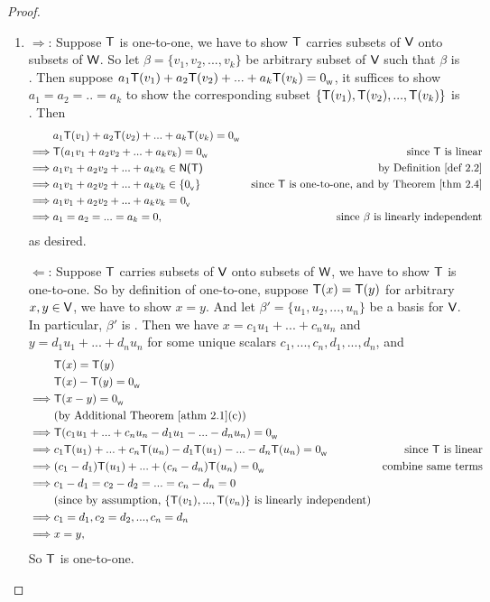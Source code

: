\begin{proof} \ 
\begin{enumerate}
\item
\(\Longrightarrow\): Suppose \(\textsf{T}\) is one-to-one, we have to show \(\textsf{T}\) carries \LID{} subsets of \(\textsf{V}\) onto \LID{} subsets of \(\textsf{W}\).
So let \(\beta = \{ v_1, v_2, ..., v_k \}\) be arbitrary subset of \(\textsf{V}\) such that \(\beta\) is \LID{}.
Then suppose \(a_1\textsf{T}(v_1) + a_2\textsf{T}(v_2) + ... + a_k\textsf{T}(v_k) = 0_{_{\textsf{W}}}\), it suffices to show \(a_1 = a_2 = .. = a_k\) to show the corresponding subset \(\{ \textsf{T}(v_1), \textsf{T}(v_2), ..., \textsf{T}(v_k) \}\) is \LID{}.
Then
\begin{align*}
             & a_1\T(v_1) + a_2\T(v_2) + ... + a_k\T(v_k) = \OW \\
    \implies & \T(a_1 v_1 + a_2 v_2 + ... + a_k v_k) = \OW & \text{since \(\T\) is linear} \\
    \implies & a_1 v_1 + a_2 v_2 + ... + a_k v_k \in \NULLT & \text{by \DEF{2.2}} \\
    \implies & a_1 v_1 + a_2 v_2 + ... + a_k v_k \in \{ \OV \} & \text{since \(\T\) is one-to-one, and by \THM{2.4}} \\
    \implies & a_1 v_1 + a_2 v_2 + ... + a_k v_k = \OV \\
    \implies & a_1 = a_2 = ... = a_k = 0, & \text{since \(\beta\) is \LID{}}
\end{align*}
as desired.

\(\Longleftarrow\): Suppose \(\textsf{T}\) carries \LID{} subsets of \(\textsf{V}\) onto \LID{} subsets of \(\textsf{W}\), we have to show \(\textsf{T}\) is one-to-one.
So by definition of one-to-one, suppose \(\textsf{T}(x) = \textsf{T}(y)\) for arbitrary \(x, y \in \textsf{V}\), we have to show \(x = y\).
And let \(\beta' = \{ u_1, u_2, ..., u_n \}\) be a basis for \(\textsf{V}\).
In particular, \(\beta'\) is \LID{}.
Then we have \(x = c_1 u_1 + ... + c_n u_n\) and \(y = d_1 u_1 + ... + d_n u_n\) for some unique scalars \(c_1, ..., c_n, d_1, ..., d_n\), and
\begin{align*}
             & \T(x) = \T(y) \\
             & \T(x) - \T(y) = \OW \\
    \implies & \T(x - y) = \OW \\
             & \text{(by \ATHM{2.1}(c))} \\
    \implies & \T(c_1 u_1 + ... + c_n u_n - d_1 u_1 - ... - d_n u_n) = \OW \\
    \implies & c_1\T(u_1) + ... + c_n\T(u_n) - d_1\T(u_1) - ... - d_n\T(u_n) = \OW & \text{since \(\T\) is linear} \\
    \implies & (c_1 - d_1)\T(u_1) + ... + (c_n - d_n)\T(u_n) = \OW & \text{combine same terms} \\
    \implies & c_1 - d_1 = c_2 - d_2 = ... = c_n - d_n = 0 & \\
             & \text{(since by assumption, \(\{ \T(v_1), ..., \T(v_n) \}\) is \LID{})} \\
    \implies & c_1 = d_1, c_2 = d_2, ..., c_n = d_n \\
    \implies & x = y,
\end{align*}
So \(\textsf{T}\) is one-to-one.


\end{enumerate}
\end{proof}
